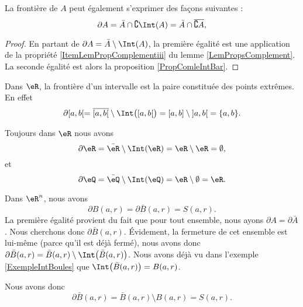 \begin{lemma}
	La frontière de $A$ peut également s'exprimer des façons suivantes :
	\begin{equation}
		\partial A= \bar A\cap\complement\Int(A)=\bar A\cap\overline{ \complement A },
	\end{equation}
\end{lemma}

\begin{proof}
	En partant de $\partial A=\bar A\setminus \Int(A)$, la première égalité est une application de la propriété \ref{ItemLemPropComplementiii} du lemme \ref{LemPropsComplement}. La seconde égalité est alors la proposition \ref{PropComleIntBar}.
\end{proof}

\begin{example}
	Dans $\eR$, la frontière d'un intervalle est la paire constituée des points extrêmes. En effet
	\begin{equation}
		\partial\mathopen[ a , b [=\overline{ \mathopen[ a , b [ }\setminus\Int\big( \mathopen[ a , b [ \big)=\mathopen[ a , b \mathclose]\setminus\mathopen] a , b \mathclose[=\{ a,b \}.
	\end{equation}

	Toujours dans $\eR$ nous avons
	\begin{equation}
		\partial\eR=\bar\eR\setminus\Int(\eR)=\eR\setminus\eR=\emptyset,
	\end{equation}
	et
	\begin{equation}
		\partial\eQ=\bar\eQ\setminus\Int(\eQ)=\eR\setminus\emptyset=\eR.
	\end{equation}
\end{example}

\begin{example}
	Dans $\eR^n$, nous avons
	\begin{equation}
		\partial B(a,r)=\partial\bar B(a,r)=S(a,r).
	\end{equation}
	La première égalité provient du fait que pour tout ensemble, nous ayons $\partial A=\partial\bar A$. Nous cherchons donc $\partial\bar B(a,r)$. Évidement, la fermeture de cet ensemble est lui-même (parce qu'il est déjà fermé), nous avons donc $\partial\bar B(a,r)=\bar B(a,r)\setminus\Int\big( \bar B(a,r) \big)$. Nous avons déjà vu dans l'exemple \ref{ExempleIntBoules} que $\Int\big( \bar B(a,r) \big)=B(a,r)$.

	Nous avons donc
	\begin{equation}
		\partial\bar B(a,r)=\bar B(a,r)\setminus B(a,r)=S(a,r).
	\end{equation}

\end{example}

